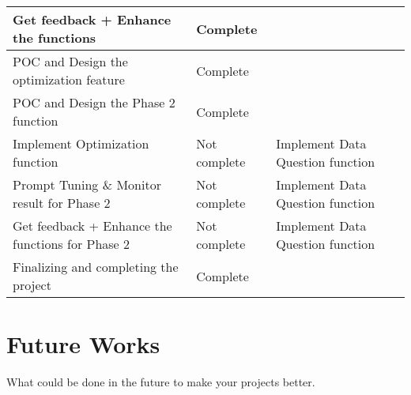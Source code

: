 \begin{table}[H]
\begin{tabular}{|p{6cm}|p{3cm}|p{5cm}|}
        \hline
        Get feedback + Enhance the functions & Complete &  \\
        \hline
        POC and Design the optimization feature & Complete & \\
        \hline
        POC and Design the Phase 2 function & Complete & \\
        \hline
        Implement Optimization function & Not complete & Implement Data Question function\\
        \hline
        Prompt Tuning \& Monitor result for Phase 2& Not complete & Implement Data Question function\\
        \hline
        Get feedback + Enhance the functions for Phase 2 & Not complete & Implement Data Question function\\
        \hline
        Finalizing and completing the project & Complete & \\
        \hline
    \end{tabular}
\end{table}
\pagebreak
\section{Future Works}
What could be done in the future to make your projects better.

\pagebreak